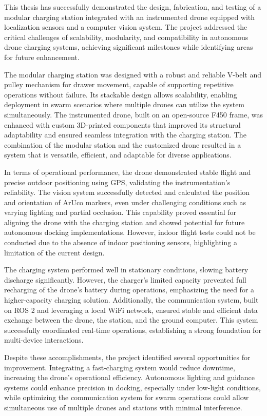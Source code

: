This thesis has successfully demonstrated the design, fabrication, and testing of a modular charging station integrated with an instrumented drone equipped with localization sensors and a computer vision system. The project addressed the critical challenges of scalability, modularity, and compatibility in autonomous drone charging systems, achieving significant milestones while identifying areas for future enhancement.

The modular charging station was designed with a robust and reliable V-belt and pulley mechanism for drawer movement, capable of supporting repetitive operations without failure. Its stackable design allows scalability, enabling deployment in swarm scenarios where multiple drones can utilize the system simultaneously. The instrumented drone, built on an open-source F450 frame, was enhanced with custom 3D-printed components that improved its structural adaptability and ensured seamless integration with the charging station. The combination of the modular station and the customized drone resulted in a system that is versatile, efficient, and adaptable for diverse applications.

In terms of operational performance, the drone demonstrated stable flight and precise outdoor positioning using GPS, validating the instrumentation's reliability. The vision system successfully detected and calculated the position and orientation of ArUco markers, even under challenging conditions such as varying lighting and partial occlusion. This capability proved essential for aligning the drone with the charging station and showed potential for future autonomous docking implementations. However, indoor flight tests could not be conducted due to the absence of indoor positioning sensors, highlighting a limitation of the current design.

The charging system performed well in stationary conditions, slowing battery discharge significantly. However, the charger’s limited capacity prevented full recharging of the drone’s battery during operations, emphasizing the need for a higher-capacity charging solution. Additionally, the communication system, built on ROS 2 and leveraging a local WiFi network, ensured stable and efficient data exchange between the drone, the station, and the ground computer. This system successfully coordinated real-time operations, establishing a strong foundation for multi-device interactions.

Despite these accomplishments, the project identified several opportunities for improvement. Integrating a fast-charging system would reduce downtime, increasing the drone’s operational efficiency. Autonomous lighting and guidance systems could enhance precision in docking, especially under low-light conditions, while optimizing the communication system for swarm operations could allow simultaneous use of multiple drones and stations with minimal interference.

